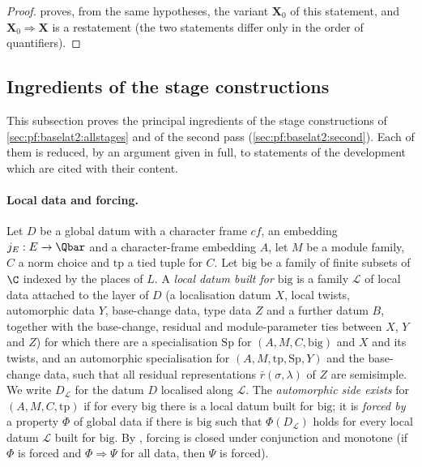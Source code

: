 \begin{proof}
 proves, from the same hypotheses, the
variant $\mathbf{X}_0$ of this statement, and $\mathbf{X}_0\Rightarrow\mathbf{X}$ is a restatement (the two statements differ only in the order of quantifiers).
\end{proof}

\subsection{Ingredients of the stage constructions}\label{sec:pf:baselat2:ingr}

This subsection proves the principal ingredients of the stage constructions of
\cref{sec:pf:baselat2:allstages} and of the second pass (\cref{sec:pf:baselat2:second}). Each of them is
reduced, by an argument given in full, to statements of the development which are cited with their
content.

\paragraph{Local data and forcing.} Let $D$ be a global datum with a character frame $cf$, an embedding
$j_E:E\to\Qbar$ and a character-frame embedding $A$, let $M$ be a module family, $C$ a norm choice and
$\mathrm{tp}$ a tied tuple for $C$. Let $\mathrm{big}$ be a family of finite subsets of $\C$ indexed by the
places of $L$. A \emph{local datum built for $\mathrm{big}$} is a family $\mathcal L$ of local data attached to
the layer of $D$ (a localisation datum $X$, local twists, automorphic data $Y$, base-change data, type data
$Z$ and a further datum $B$, together with the base-change, residual and module-parameter ties between
$X$, $Y$ and $Z$) for which there are a specialisation $\mathrm{Sp}$ for $(A,M,C,\mathrm{big})$ and $X$ and its
twists, and an automorphic specialisation for $(A,M,\mathrm{tp},\mathrm{Sp},Y)$ and the base-change data, such
that all residual representations $\bar r(\sigma,\lambda)$ of $Z$ are semisimple. We write $D_{\mathcal L}$ for the
datum $D$ localised along $\mathcal L$. The \emph{automorphic side exists} for $(A,M,C,\mathrm{tp})$ if for every
$\mathrm{big}$ there is a local datum built for $\mathrm{big}$; it is \emph{forced by} a property $\Phi$ of global
data if there is $\mathrm{big}$ such that $\Phi(D_{\mathcal L})$ holds for every local datum $\mathcal L$ built for
$\mathrm{big}$. By , forcing is closed under
conjunction and monotone (if $\Phi$ is forced and $\Phi\Rightarrow\Psi$ for all data, then $\Psi$ is forced).

